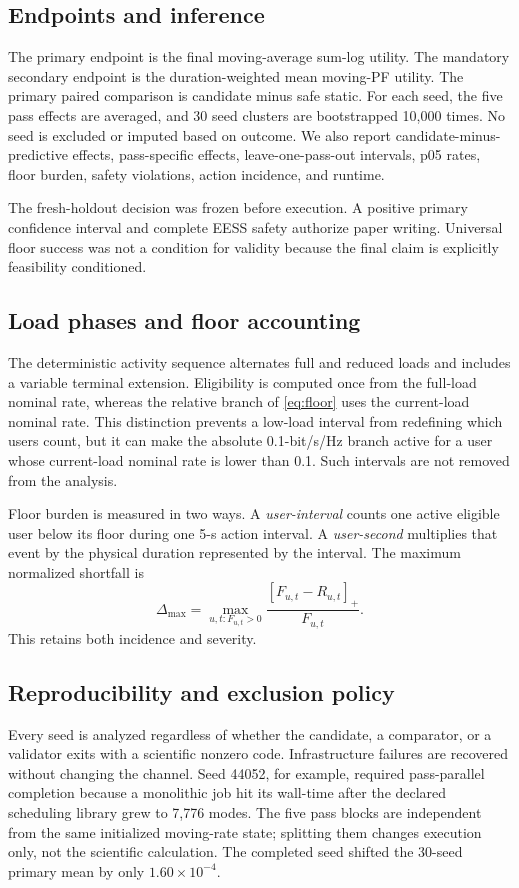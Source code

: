 \documentclass[journal]{IEEEtran}
\begin{document}
\subsection{Endpoints and inference}
The primary endpoint is the final moving-average sum-log utility. The mandatory secondary endpoint is the duration-weighted mean moving-PF utility. The primary paired comparison is candidate minus safe static. For each seed, the five pass effects are averaged, and 30 seed clusters are bootstrapped 10,000 times. No seed is excluded or imputed based on outcome. We also report candidate-minus-predictive effects, pass-specific effects, leave-one-pass-out intervals, p05 rates, floor burden, safety violations, action incidence, and runtime.

The fresh-holdout decision was frozen before execution. A positive primary confidence interval and complete EESS safety authorize paper writing. Universal floor success was not a condition for validity because the final claim is explicitly feasibility conditioned.


\subsection{Load phases and floor accounting}
The deterministic activity sequence alternates full and reduced loads and includes a variable terminal extension. Eligibility is computed once from the full-load nominal rate, whereas the relative branch of \eqref{eq:floor} uses the current-load nominal rate. This distinction prevents a low-load interval from redefining which users count, but it can make the absolute 0.1-bit/s/Hz branch active for a user whose current-load nominal rate is lower than 0.1. Such intervals are not removed from the analysis.

Floor burden is measured in two ways. A \emph{user-interval} counts one active eligible user below its floor during one 5-s action interval. A \emph{user-second} multiplies that event by the physical duration represented by the interval. The maximum normalized shortfall is
\begin{equation}
 \Delta_{\max}=\max_{u,t:F_{u,t}>0}
 \frac{[F_{u,t}-R_{u,t}]_+}{F_{u,t}}.
 \label{eq:shortfall}
\end{equation}
This retains both incidence and severity.

\subsection{Reproducibility and exclusion policy}
Every seed is analyzed regardless of whether the candidate, a comparator, or a validator exits with a scientific nonzero code. Infrastructure failures are recovered without changing the channel. Seed 44052, for example, required pass-parallel completion because a monolithic job hit its wall-time after the declared scheduling library grew to 7,776 modes. The five pass blocks are independent from the same initialized moving-rate state; splitting them changes execution only, not the scientific calculation. The completed seed shifted the 30-seed primary mean by only $1.60\times10^{-4}$.
\end{document}
